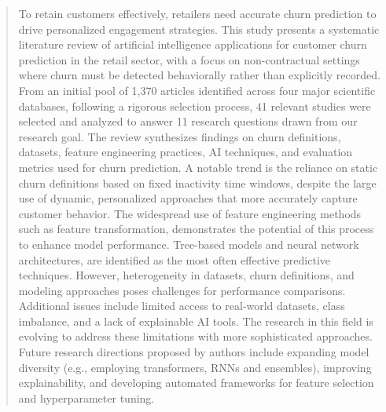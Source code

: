 \documentclass[preprint,12pt]{elsarticle}
\newcommand{\DD}[2]{\textcolor{blue}{#1}[\textcolor{red}{#2}]}
\begin{document}
\begin{frontmatter}
\begin{abstract}
To retain customers effectively, retailers need accurate churn prediction to drive personalized engagement strategies. This study presents a systematic literature review of artificial intelligence applications for customer churn prediction in the retail sector, with a focus on non-contractual settings where churn must be detected behaviorally rather than explicitly recorded. From an initial pool of 1,370 articles identified across four major scientific databases, following a rigorous selection process, 41 relevant studies were selected and analyzed to answer 11 research questions drawn from our research goal. The review synthesizes findings on churn definitions, datasets, feature engineering practices, AI techniques, and evaluation metrics used for churn prediction. A notable trend is the reliance on static churn definitions based on fixed inactivity time windows, despite the large use of dynamic, personalized approaches that more accurately capture customer behavior. The widespread use of feature engineering methods such as feature transformation, demonstrates the potential of this process to enhance model performance.
 Tree-based models and neural network architectures, are identified as the most often effective predictive techniques. However, heterogeneity in datasets, churn definitions, and modeling approaches poses challenges for performance comparisons. Additional issues include limited access to real-world datasets, class imbalance, and a lack of explainable AI tools. The research in this field is evolving to address these limitations with more sophisticated approaches. Future research directions proposed by authors include expanding model diversity (e.g., employing transformers, RNNs and ensembles), improving explainability, and developing automated frameworks for feature selection and hyperparameter tuning.











\end{abstract}
\end{frontmatter}
\end{document}
